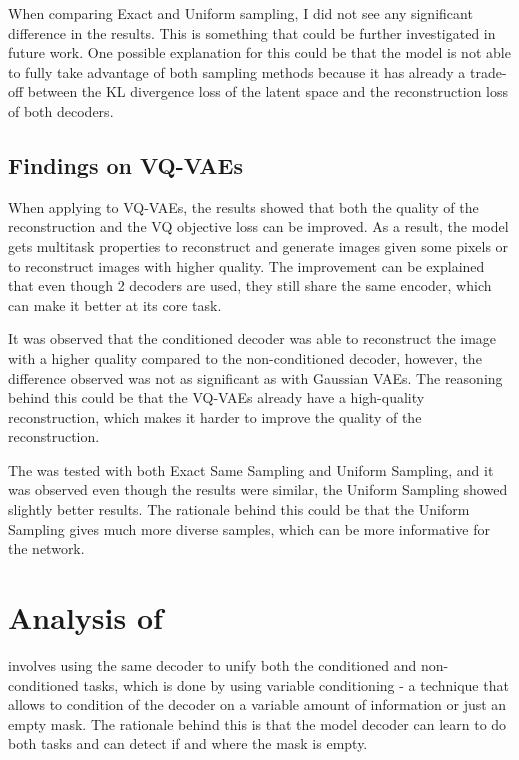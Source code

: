 When comparing Exact and Uniform sampling, I did not see any significant difference in the results. This is something that could be further investigated in future work. One possible explanation for this could be that the model is not able to fully take advantage of both sampling methods because it has already a trade-off between the KL divergence loss of the latent space and the reconstruction loss of both decoders.

\subsection{Findings on VQ-VAEs}

When applying  to VQ-VAEs, the results showed that both the quality of the reconstruction and the VQ objective loss can be improved. As a result, the model gets multitask properties to reconstruct and generate images given some pixels or to reconstruct images with higher quality. The improvement can be explained that even though 2 decoders are used, they still share the same encoder, which can make it better at its core task. 

It was observed that the conditioned decoder was able to reconstruct the image with a higher quality compared to the non-conditioned decoder, however, the difference observed was not as significant as with Gaussian VAEs. The reasoning behind this could be that the VQ-VAEs already have a high-quality reconstruction, which makes it harder to improve the quality of the reconstruction.

The  was tested with both Exact Same Sampling and Uniform Sampling, and it was observed even though the results were similar, the Uniform Sampling showed slightly better results. The rationale behind this could be that the Uniform Sampling gives much more diverse samples, which can be more informative for the network.


\section{Analysis of }

 involves using the same decoder to unify both the conditioned and non-conditioned tasks, which is done by using variable conditioning - a technique that allows to condition of the decoder on a variable amount of information or just an empty mask. The rationale behind this is that the model decoder can learn to do both tasks and can detect if and where the mask is empty.

